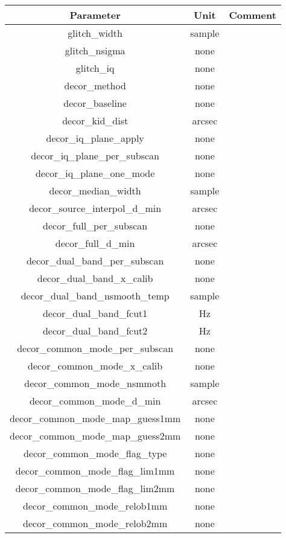 \documentclass[a4paper,10pt]{article}
\begin{document}
	\begin{table}[ht]
	\begin{center}
	\begin{tabular}{|c|c|c|}
         \hline

	Parameter & Unit & Comment \\
	\hline
	glitch\_width & sample & \\
	glitch\_nsigma & none & \\
	glitch\_iq & none & \\
	decor\_method & none & \\
	decor\_baseline & none & \\
	decor\_kid\_dist & arcsec & \\
	decor\_iq\_plane\_apply & none & \\
	decor\_iq\_plane\_per\_subscan & none & \\
	decor\_iq\_plane\_one\_mode & none &  \\
	decor\_median\_width & sample & \\
	decor\_source\_interpol\_d\_min & arcsec &  \\
	decor\_full\_per\_subscan & none & \\
	decor\_full\_d\_min & arcsec & \\
	decor\_dual\_band\_per\_subscan & none & \\
	decor\_dual\_band\_x\_calib & none & \\
	decor\_dual\_band\_nsmooth\_temp & sample & \\
	decor\_dual\_band\_fcut1 & Hz & \\
	decor\_dual\_band\_fcut2 & Hz & \\
	decor\_common\_mode\_per\_subscan & none & \\
	decor\_common\_mode\_x\_calib & none &  \\
	decor\_common\_mode\_nsmmoth & sample & \\
	decor\_common\_mode\_d\_min & arcsec &  \\
	decor\_common\_mode\_map\_guess1mm & none & \\
	decor\_common\_mode\_map\_guess2mm & none & \\
	decor\_common\_mode\_flag\_type & none & \\
	decor\_common\_mode\_flag\_lim1mm & none & \\
	decor\_common\_mode\_flag\_lim2mm & none & \\
	decor\_common\_mode\_relob1mm & none & \\
	decor\_common\_mode\_relob2mm & none & \\

\end{tabular}
\end{center}
\end{table}
\end{document}

